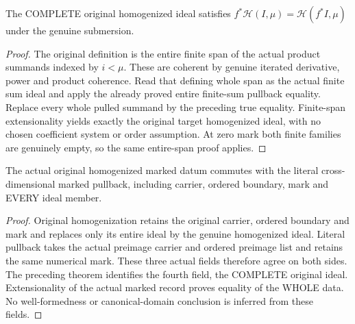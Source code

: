 \begin{theorem}\label{hir:submersion-entire-homogenized-ideal-equality}
The COMPLETE original homogenized ideal satisfies
$f^*\mathcal H(I,\mu)=\mathcal H(f^*I,\mu)$ under the genuine submersion.
\leanok
{}
\end{theorem}
\begin{proof}
The original definition is the entire finite span of the actual product
summands indexed by $i<\mu$. These are coherent by genuine iterated derivative,
power and product coherence. Read that defining whole span as the actual finite
sum ideal and apply the already proved entire finite-sum pullback equality.
Replace every whole pulled summand by the preceding true equality. Finite-span
extensionality yields exactly the original target homogenized ideal, with no
chosen coefficient system or order assumption. At zero mark both finite families
are genuinely empty, so the same entire-span proof applies.
\end{proof}

\begin{theorem}\label{hir:submersion-literal-whole-homogenized-marked-equality}
The actual original homogenized marked datum commutes with the literal
cross-dimensional marked pullback, including carrier, ordered boundary, mark
and EVERY ideal member.
\leanok
{}
\end{theorem}
\begin{proof}
Original homogenization retains the original carrier, ordered boundary and mark
and replaces only its entire ideal by the genuine homogenized ideal. Literal
pullback takes the actual preimage carrier and ordered preimage list and retains
the same numerical mark. These three actual fields therefore agree on both sides.
The preceding theorem identifies the fourth field, the COMPLETE original ideal.
Extensionality of the actual marked record proves equality of the WHOLE data.
No well-formedness or canonical-domain conclusion is inferred from these fields.
\end{proof}

